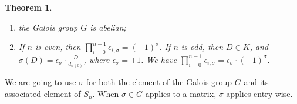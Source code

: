 \documentclass[12pt,psamsfonts]{amsart}
\newcommand{\e}{{\epsilon}}
\newcommand{\Q}{\mathbb Q}
\newcommand{\mN}{\mathcal{N}}
\numberwithin{equation}{section}
\newtheorem{theorem}{Theorem}[section]
\theoremstyle{definition}
\begin{document}
\begin{theorem}
\begin{enumerate}
\item the Galois group $G$ is abelian;

\item If $n$ is even, then
$\prod_{i=0}^{n-1}\e_{i,\sigma}=(-1)^{\sigma}$.  If $n$ is odd,
then $D\in K$, and $\sigma(D)=\e_{\sigma}\cdot
\frac{D}{d_{\sigma(0)}}$, where $\e_{\sigma}=\pm 1$. We have
$\prod_{i=0}^{n-1}\e_{i,\sigma}=\e_{\sigma} \cdot (-1)^{\sigma}$.


\end{enumerate}


\end{theorem}


We are going to use $\sigma$ for both the element of the Galois
group $G$ and its associated element of $S_n$.  When $\sigma \in
G$ applies to a matrix, $\sigma$ applies entry-wise.
\end{document}
